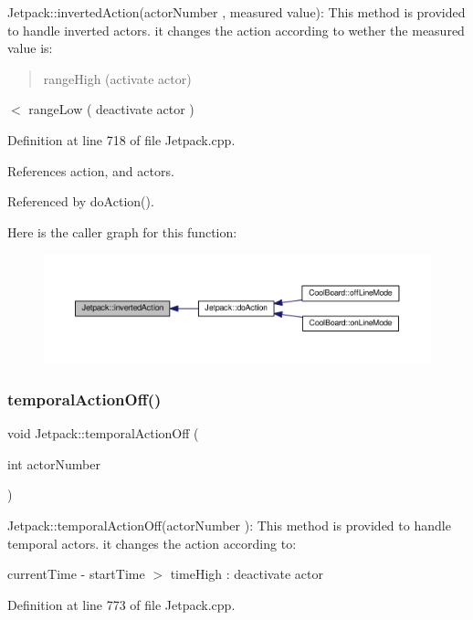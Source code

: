 Jetpack\+::inverted\+Action(actor\+Number , measured value)\+: This method is provided to handle inverted actors. it changes the action according to wether the measured value is\+: \begin{quote}
range\+High (activate actor) \end{quote}
$<$ range\+Low ( deactivate actor ) 

Definition at line 718 of file Jetpack.\+cpp.



References action, and actors.



Referenced by do\+Action().

Here is the caller graph for this function\+:
\nopagebreak
\begin{figure}[H]
\begin{center}
\leavevmode
\includegraphics[width=350pt]{df/d1d/class_jetpack_adacfc35fab4a621357caf98ce1c9cb54_icgraph}
\end{center}
\end{figure}
\mbox{\label{class_jetpack_a2991b302cd99bf89325f9b66b104d575}} 
\subsubsection{\texorpdfstring{temporal\+Action\+Off()}{temporalActionOff()}}
{\footnotesize\ttfamily void Jetpack\+::temporal\+Action\+Off (\begin{DoxyParamCaption}\item[{int}]{actor\+Number }\end{DoxyParamCaption})}

Jetpack\+::temporal\+Action\+Off(actor\+Number )\+: This method is provided to handle temporal actors. it changes the action according to\+:

current\+Time -\/ start\+Time $>$ time\+High \+: deactivate actor 

Definition at line 773 of file Jetpack.\+cpp.



